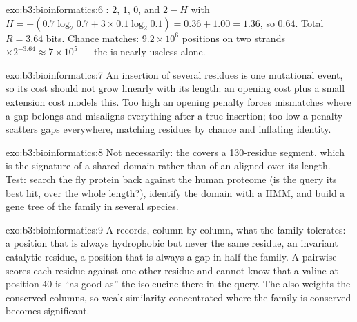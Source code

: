 \begin{solution}{exo:b3:bioinformatics:6}
: $2$, $1$, $0$, and $2 - H$ with $H = -(0.7\log_{2}
0.7 + 3\times 0.1\log_{2} 0.1) = 0.36 + 1.00 = 1.36$, so $0.64$. Total
$R = 3.64$ bits. Chance matches: $9.2\times 10^{6}$ positions on two
strands $\times 2^{-3.64} \approx 7\times 10^{5}$ --- the  is
nearly useless alone.
\end{solution}

\begin{solution}{exo:b3:bioinformatics:7}
An insertion of several residues is one mutational event, so its cost
should not grow linearly with its length: an opening cost plus a small
extension cost models this. Too high an opening penalty forces
mismatches where a gap belongs and misaligns everything after a true
insertion; too low a penalty scatters gaps everywhere, matching
residues by chance and inflating identity.
\end{solution}

\begin{solution}{exo:b3:bioinformatics:8}
Not necessarily: the  covers a \num{130}-residue segment,
which is the signature of a shared domain rather than of an 
aligned over its length. Test: search the fly protein back against the
human proteome (is the query its best hit, over the whole length?),
identify the domain with a  HMM, and build a gene tree of the
family in several species.
\end{solution}

\begin{solution}{exo:b3:bioinformatics:9}
A  records, column by column, what the family tolerates: a
position that is always hydrophobic but never the same residue, an
invariant catalytic residue, a position that is always a gap in half
the family. A pairwise  scores each residue against one other
residue and cannot know that a valine at position 40 is ``as good as''
the isoleucine there in the query. The  also weights the
conserved columns, so weak similarity concentrated where the family is
conserved becomes significant.
\end{solution}

